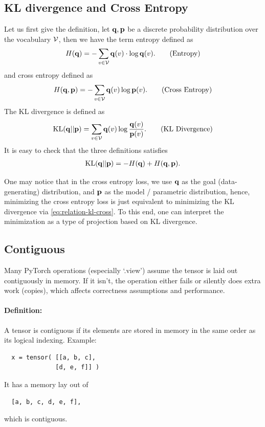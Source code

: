 \documentclass[11pt]{article}  %
\begin{document}
\subsection{KL divergence and Cross Entropy}
Let us first give the definition, let $\mathbf{q}, \mathbf{p}$ be a discrete probability distribution over the vocabulary $\mathcal{V}$, then we have the term entropy defined as  
\begin{align}
  H(\mathbf{q}) = - \sum_{v \in \mathcal{V}} \mathbf{q}(v) \cdot \log \mathbf{q}(v). \tag{Entropy}
\end{align} 
and cross entropy defined as 
\begin{align}
  H(\mathbf{q}, \mathbf{p}) = - \sum_{v \in \mathcal{V}} \mathbf{q}(v) \log \mathbf{p}(v). \tag{Cross Entropy}
\end{align}
The KL divergence is defined as 
\begin{align}
  \text{KL}(\mathbf{q} || \mathbf{p}) = \sum_{v \in \mathcal{V}} \mathbf{q}(v) \log \frac{\mathbf{q}(v)}{\mathbf{p}(v)}. \tag{KL Divergence}
\end{align}
It is easy to check that the three definitions satisfies 
\begin{align}
  \label{eq:relation-kl-cross}
  \text{KL}(\mathbf{q} || \mathbf{p}) = -H(\mathbf{q}) + H(\mathbf{q}, \mathbf{p}).
\end{align}

One may notice that in the cross entropy loss, we use $\mathbf{q}$ as the goal (data-generating) distribution, and $\mathbf{p}$ as the model / parametric distribution, hence, minimizing the cross entropy loss is just equivalent to minimizing the KL divergence via \eqref{eq:relation-kl-cross}.
To this end, one can interpret the minimization as a type of projection based on KL divergence.


\subsection{Contiguous}
Many PyTorch operations (especially `.view') assume the tensor is laid out contiguously in memory.
If it isn't, the operation either fails or silently does extra work (copies), which affects correctness assumptions and performance.

\paragraph{Definition:}
A tensor is contiguous if its elements are stored in memory in the same order as its logical indexing.
Example:
\begin{lstlisting}
  x = tensor( [[a, b, c],
              [d, e, f]] )
\end{lstlisting}
It has a memory lay out of 
\begin{lstlisting}
  [a, b, c, d, e, f],
\end{lstlisting}
which is contiguous.
\end{document}
